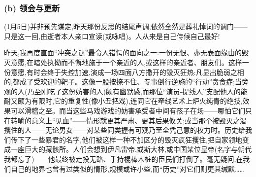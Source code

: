 \subsubsection*{(b) 领会与更新}
\label{ch18:local:h72}

\label{ch18:local:n67}

(1月5日)并非预先谋定,昨天那份反思的结尾声调,依然全然是葬礼悼词的调门——只是这一回,由逝者本人亲口宣读(或咏唱)。人从来是自己侍候自己最好!

昨天,我再度直面“冲突之谜”最令人错愕的面向之一:一份无恨、亦无表面缘由的毁灭意愿,在暗处执拗而不懈地施于一个亲近的人,或这样的亲近者、朋友们。这样一份意愿,有时会终于失控加速,演成一场四面八方撒开的毁灭狂热:凡显出脆弱之相的,都成了受欢迎的靶子。这像一股按捺不住、专事倒行逆施的“行动”贪食症;当旁观的人(乃至刚吃了这份妨害的人)颇有幽默感\dmark{},而那位“演员-提线人”支配他人的能耐又颇为有限时,它的重复性(像小丑把戏),连同它在牵线艺术上炉火纯青的绝技,效果可以滑稽之至。而当这些马戏游戏的妨害承受者中间有孩子在场——哪怕它们只在转喻的意义上“见血”——情形就更其严肃、更其后果攸关;或当那个被毁灭之渴攫住的人——无论男女——对某些同类握有可观乃至全凭己意的权力时。历史给我们传下了一些暴君的名字,他们被这样一种不加区分的毁灭疯狂攫住,把自家领地变成一座巨大的藏骸所。人们会想到伊凡雷帝,或斯大林,或中国某位皇帝(名字与朝代我都忘了)——他最终被走投无路、手持棍棒木桩的臣民们打倒了。毫无疑问,在我们自己的地界也曾有过类似的情形,规模或许小些,而“历史”对它们则更其缄默……

